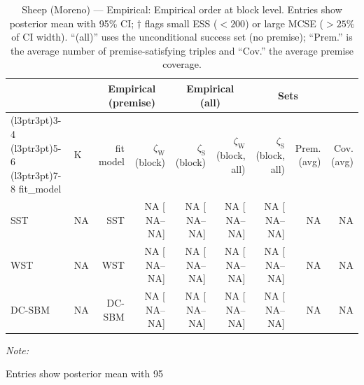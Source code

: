 \begin{table}
\centering
\caption{\label{tab:tab:sheep-moreno-empirical-emp-block}Sheep (Moreno) — Empirical: Empirical order at block level. Entries show posterior mean with 95\% CI; $\dagger$ flags small ESS ($<200$) or large MCSE ($>25\%$ of CI width). “(all)” uses the unconditional success set (no premise); “Prem.” is the average number of premise-satisfying triples and “Cov.” the average premise coverage.}
\centering
\begin{threeparttable}
\begin{tabular}[t]{llrrrrrrr}
\toprule
\multicolumn{2}{c}{ } & \multicolumn{2}{c}{Empirical (premise)} & \multicolumn{2}{c}{Empirical (all)} & \multicolumn{2}{c}{Sets} \\
\cmidrule(l{3pt}r{3pt}){3-4} \cmidrule(l{3pt}r{3pt}){5-6} \cmidrule(l{3pt}r{3pt}){7-8}
fit_model & K & fit model & $\zeta_{\mathrm{W}}$ (block) & $\zeta_{\mathrm{S}}$ (block) & $\zeta_{\mathrm{W}}$ (block, all) & $\zeta_{\mathrm{S}}$ (block, all) & Prem. (avg) & Cov. (avg)\\
\midrule
SST & NA & SST & NA [  NA--  NA] & NA [  NA--  NA] & NA [  NA--  NA] & NA [  NA--  NA] & NA & NA\\
WST & NA & WST & NA [  NA--  NA] & NA [  NA--  NA] & NA [  NA--  NA] & NA [  NA--  NA] & NA & NA\\
DC-SBM & NA & DC-SBM & NA [  NA--  NA] & NA [  NA--  NA] & NA [  NA--  NA] & NA [  NA--  NA] & NA & NA\\
\bottomrule
\end{tabular}
\begin{tablenotes}
\item \textit{Note: } 
\item Entries show posterior mean with 95%
\end{tablenotes}
\end{threeparttable}
\end{table}